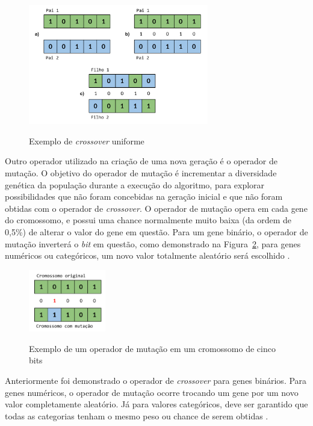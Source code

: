 \documentclass[12pt,oneside,a4paper,english,french,spanish,brazil,]{abntex2}
\begin{document}
\begin{figure}[ht]
\centering
\caption{Exemplo de \textit{crossover} uniforme}
\includegraphics[width=0.7\textwidth]{imagens/GA_Crossover_Uniforme.pdf}
\label{fig:GA_Crossover_Uniforme}
\end{figure}

Outro operador utilizado na criação de uma nova geração é o operador de mutação. O objetivo do operador de mutação é incrementar a diversidade genética da população durante a execução do algoritmo, para explorar possibilidades que não foram concebidas na geração inicial e que não foram obtidas com o operador de \textit{crossover}. O operador de mutação opera em cada gene do cromossomo, e possui uma chance normalmente muito baixa (da ordem de 0,5\%) de alterar o valor do gene em questão. Para um gene binário, o operador de mutação inverterá o \textit{bit} em questão, como demonstrado na Figura~\ref{fig:GA_Mutacao}, para genes numéricos ou categóricos, um novo valor totalmente aleatório será escolhido \cite{linden:2008}.

\begin{figure}[ht]
\centering
\caption{Exemplo de um operador de mutação em um cromossomo de cinco bits}
\includegraphics[width=0.3\textwidth]{imagens/GA_Mutacao.pdf}
\label{fig:GA_Mutacao}
\end{figure}

Anteriormente foi demonstrado o operador de \textit{crossover} para genes binários. Para genes numéricos, o operador de mutação ocorre trocando um gene por um novo valor completamente aleatório. Já para valores categóricos, deve ser garantido que todas as categorias tenham o mesmo peso ou chance de serem obtidas \cite{linden:2008}.
\end{document}
